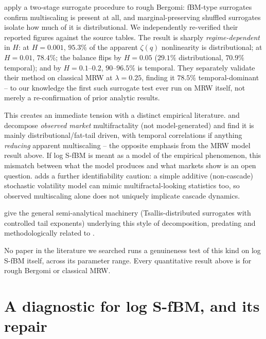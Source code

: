 \documentclass[11pt]{article}
\begin{document}
\citet{brandi2026multiscaling} apply a two-stage surrogate procedure to rough Bergomi: fBM-type surrogates confirm multiscaling is present at all, and marginal-preserving shuffled surrogates isolate how much of it is distributional. We independently re-verified their reported figures against the source tables. The result is sharply \emph{regime-dependent} in $H$: at $H=0.001$, $95.3\%$ of the apparent $\zeta(q)$ nonlinearity is distributional; at $H=0.01$, $78.4\%$; the balance flips by $H=0.05$ ($29.1\%$ distributional, $70.9\%$ temporal); and by $H=0.1$--$0.2$, $90$--$96.5\%$ is temporal. They separately validate their method on classical MRW at $\lambda=0.25$, finding it $78.5\%$ temporal-dominant -- to our knowledge the first such surrogate test ever run on MRW itself, not merely a re-confirmation of prior analytic results.

This creates an immediate tension with a distinct empirical literature. \citet{zhou2009finite} and \citet{jiang2012understanding} decompose \emph{observed market} multifractality (not model-generated) and find it is mainly distributional/fat-tail driven, with temporal correlations if anything \emph{reducing} apparent multiscaling -- the opposite emphasis from the MRW model result above. If log S-fBM is meant as a model of the empirical phenomenon, this mismatch between what the model produces and what markets show is an open question. \citet{lebaron2001stochastic} adds a further identifiability caution: a simple additive (non-cascade) stochastic volatility model can mimic multifractal-looking statistics too, so observed multiscaling alone does not uniquely implicate cascade dynamics.

\citet{rak2018quantitative} give the general semi-analytical machinery (Tsallis-distributed surrogates with controlled tail exponents) underlying this style of decomposition, predating and methodologically related to \citet{brandi2026multiscaling}.

\begin{finding}
No paper in the literature we searched runs a genuineness test of this kind on log S-fBM itself, across its parameter range. Every quantitative result above is for rough Bergomi or classical MRW.
\end{finding}

\section{A diagnostic for log S-fBM, and its repair}
\label{sec:diagnostic}
\end{document}
